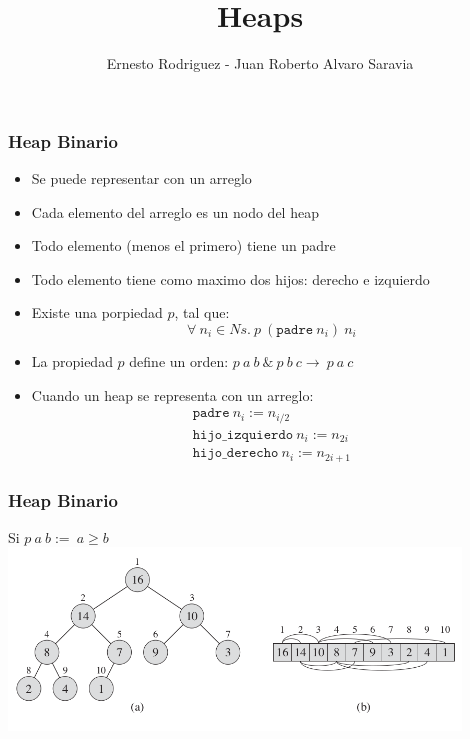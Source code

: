 \documentclass{beamer}
\title[Heap]{Heaps}
\author{Ernesto Rodriguez - Juan Roberto Alvaro Saravia}
\institute{
    Universidad Francisco Marroquin \\
    \medskip \textit{ernestorodriguez@ufm.edu - juanalvarado@ufm.edu}
}
\date[\today]{}
\begin{document}
\begin{frame}
\titlepage
\end{frame}

\begin{frame}
\frametitle{Heap Binario}
\begin{itemize}
    \item{Se puede representar con un arreglo}
    \item{Cada elemento del arreglo es un nodo del heap}
    \item{Todo elemento (menos el primero) tiene un padre}
    \item{Todo elemento tiene como maximo dos hijos: derecho e izquierdo}
    \item{Existe una porpiedad $p$, tal que:
    \[
        \forall\ n_i\in Ns.\ p\ (\mathtt{padre}\ n_i)\ n_i
    \]}
    \item{La propiedad $p$ define un orden: $p\ a\ b\ \&\ p\ b\ c\rightarrow\ p\ a\ c$}
    \item{Cuando un heap se representa con un arreglo:
    \[
        \begin{array}{l}
            \mathtt{padre}\ n_i:=n_{i/2} \\
            \mathtt{hijo\_izquierdo}\ n_i:=n_{2i}\\
            \mathtt{hijo\_derecho}\ n_i:=n_{2i+1}
        \end{array}
    \]
    }
\end{itemize}
\end{frame}

\begin{frame}
\frametitle{Heap Binario}
Si $p\ a\ b:=\ a\geq b$
\\
\includegraphics[width=12cm]{bheap.png}
\end{frame}
\end{document}
